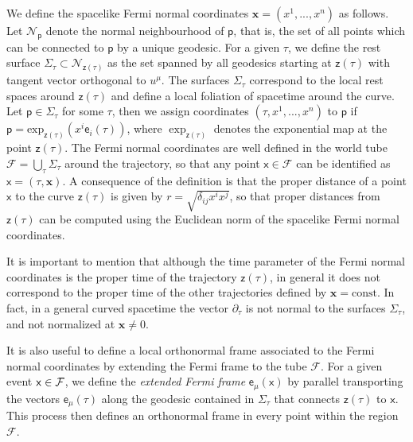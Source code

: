 \documentclass[prd,twocolumn,superscriptaddress,floatfix,amsmath,amssymb,amsfonts,longbibliography,nofootinbib]{revtex4-1}
\newcommand{\mf}{\mathsf}%
\newcommand{\tb}[1]{\textcolor{black}{#1}}
\begin{document}
We define the spacelike Fermi normal coordinates \mbox{$\bm x=(x^1,...,x^n)$} as follows. Let $\mathcal{N}_\mf{p}$ denote the normal neighbourhood of $\mf p$, that is, the set of all points which can be connected to $\mf p$ by a unique geodesic. For a given $\tau$, we define the rest surface $\Sigma_\tau\subset\mathcal{N}_{\mf z(\tau)}$ as the set spanned by all geodesics starting at $\mf z(\tau)$ with tangent vector orthogonal to $u^\mu$. The surfaces $\Sigma_\tau$ correspond to the local rest spaces around $\mf z (\tau)$ and define a local foliation of spacetime around the curve. Let $\mf p\in\Sigma_\tau$ for some $\tau$, then we assign coordinates $(\tau,x^1,...,x^n)$ to $\mf p$ if $\mf p = \text{exp}_{\mf z(\tau)}(x^i\mf e_i(\tau))$, where $\exp_{\mf z(\tau)}$ denotes the exponential map at the point $\mf z(\tau)$. The Fermi normal coordinates are well defined in the world tube $\mathcal{F} = \bigcup_\tau \Sigma_\tau$ around the trajectory, so that any point $\mf x\in \mathcal{F}$ can be identified as $\mf x = (\tau,\bm x)$. A consequence of the definition is that the proper distance of a point $\mf x$ to the curve $\mf z(\tau)$ is given by $r = \sqrt{\delta_{ij}x^ix^j}$, so that proper distances from $\mf z(\tau)$ can be computed using the Euclidean norm of the spacelike Fermi normal coordinates. 

It is important to mention that although the time parameter of the Fermi normal coordinates is the proper time of the trajectory $\mf z (\tau)$, in general it does not correspond to the proper time of the other trajectories defined by $\bm x = \text{const.}$ In fact, in a general curved spacetime the vector $\partial_\tau$ is not normal to the surfaces $\Sigma_\tau$, and not normalized at $\bm x \neq 0$.

It is also useful to define a local orthonormal frame associated to the Fermi normal coordinates by extending the Fermi frame to the tube $\mathcal{F}$. For a given event \mbox{$\mf x \in \tb{\mathcal{F}}$}, we define the \emph{extended Fermi frame} $\mf e_\mu(\mf x)$ by parallel transporting the vectors $\mf e_\mu(\tau)$ along the geodesic contained in $\Sigma_\tau$ that connects $\mf z(\tau)$ to $\mf x$. This process then defines an orthonormal frame in every point within the region $\mathcal{F}$.
\end{document}
